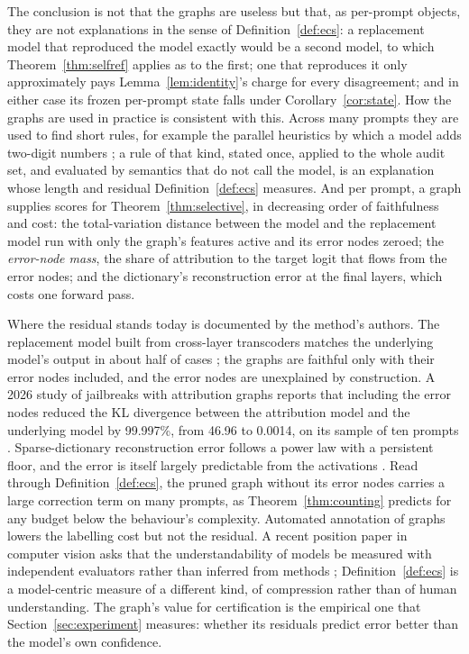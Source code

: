 \documentclass[11pt,letterpaper]{article}
\theoremstyle{plain}
\theoremstyle{definition}
\theoremstyle{remark}
\begin{document}
The conclusion is not that the graphs are useless but that, as per-prompt objects, they are not explanations in the sense of Definition~\ref{def:ecs}: a replacement model that reproduced the model exactly would be a second model, to which Theorem~\ref{thm:selfref} applies as to the first; one that reproduces it only approximately pays Lemma~\ref{lem:identity}'s charge for every disagreement; and in either case its frozen per-prompt state falls under Corollary~\ref{cor:state}. How the graphs are used in practice is consistent with this. Across many prompts they are used to find short rules, for example the parallel heuristics by which a model adds two-digit numbers \citep{lindsey2025biology}; a rule of that kind, stated once, applied to the whole audit set, and evaluated by semantics that do not call the model, is an explanation whose length and residual Definition~\ref{def:ecs} measures. And per prompt, a graph supplies scores for Theorem~\ref{thm:selective}, in decreasing order of faithfulness and cost: the total-variation distance between the model and the replacement model run with only the graph's features active and its error nodes zeroed; the \emph{error-node mass}, the share of attribution to the target logit that flows from the error nodes; and the dictionary's reconstruction error at the final layers, which costs one forward pass.

Where the residual stands today is documented by the method's authors. The replacement model built from cross-layer transcoders matches the underlying model's output in about half of cases \citep{ameisen2025circuit}; the graphs are faithful only with their error nodes included, and the error nodes are unexplained by construction. A 2026 study of jailbreaks with attribution graphs reports that including the error nodes reduced the KL divergence between the attribution model and the underlying model by 99.997\%, from 46.96 to 0.0014, on its sample of ten prompts \citep{wagle2026jailbreak}. Sparse-dictionary reconstruction error follows a power law with a persistent floor, and the error is itself largely predictable from the activations \citep{engels2024darkmatter,gao2024scaling}. Read through Definition~\ref{def:ecs}, the pruned graph without its error nodes carries a large correction term on many prompts, as Theorem~\ref{thm:counting} predicts for any budget below the behaviour's complexity. Automated annotation of graphs \citep{patel2026annotate} lowers the labelling cost but not the residual. A recent position paper in computer vision asks that the understandability of models be measured with independent evaluators rather than inferred from methods \citep{colin2026}; Definition~\ref{def:ecs} is a model-centric measure of a different kind, of compression rather than of human understanding. The graph's value for certification is the empirical one that Section~\ref{sec:experiment} measures: whether its residuals predict error better than the model's own confidence.
\end{document}
